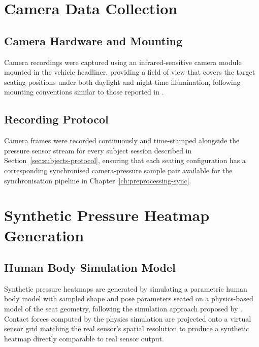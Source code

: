 \section{Camera Data Collection}
\label{sec:camera-data-collection}

\subsection{Camera Hardware and Mounting}
\label{sec:camera-hardware-mounting}
Camera recordings were captured using an infrared-sensitive camera module
mounted in the vehicle headliner, providing a field of view that covers
the target seating positions under both daylight and night-time
illumination, following mounting conventions similar to those reported in
\cite{schmidt2020driver}.

\subsection{Recording Protocol}
\label{sec:camera-recording-protocol}
Camera frames were recorded continuously and time-stamped alongside the
pressure sensor stream for every subject session described in
Section~\ref{sec:subjects-protocol}, ensuring that each seating
configuration has a corresponding synchronised camera-pressure sample
pair available for the synchronisation pipeline in
Chapter~\ref{ch:preprocessing-sync}.

\section{Synthetic Pressure Heatmap Generation}
\label{sec:synthetic-heatmap-generation}

\subsection{Human Body Simulation Model}
\label{sec:human-body-simulation-model}
Synthetic pressure heatmaps are generated by simulating a parametric
human body model with sampled shape and pose parameters seated on a
physics-based model of the seat geometry, following the simulation
approach proposed by \cite{ivanov2021synthetic}. Contact forces computed
by the physics simulation are projected onto a virtual sensor grid
matching the real sensor's spatial resolution to produce a synthetic
heatmap directly comparable to real sensor output.

